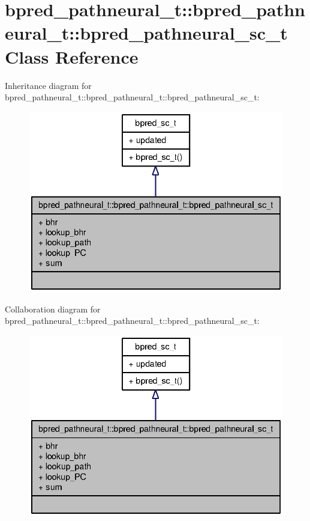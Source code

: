 \section{bpred\_\-pathneural\_\-t::bpred\_\-pathneural\_\-t::bpred\_\-pathneural\_\-sc\_\-t Class Reference}
\label{classbpred__pathneural__t_1_1bpred__pathneural__sc__t}
Inheritance diagram for bpred\_\-pathneural\_\-t::bpred\_\-pathneural\_\-t::bpred\_\-pathneural\_\-sc\_\-t:\nopagebreak
\begin{figure}[H]
\begin{center}
\leavevmode
\includegraphics[width=334pt]{classbpred__pathneural__t_1_1bpred__pathneural__sc__t__inherit__graph}
\end{center}
\end{figure}
Collaboration diagram for bpred\_\-pathneural\_\-t::bpred\_\-pathneural\_\-t::bpred\_\-pathneural\_\-sc\_\-t:\nopagebreak
\begin{figure}[H]
\begin{center}
\leavevmode
\includegraphics[width=334pt]{classbpred__pathneural__t_1_1bpred__pathneural__sc__t__coll__graph}
\end{center}
\end{figure}
